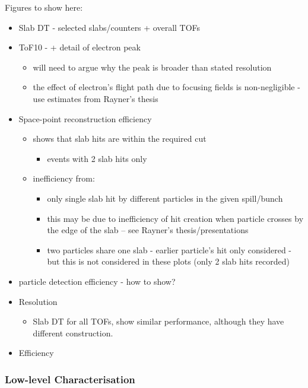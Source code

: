 Figures to show here:
\begin{itemize}
\item Slab DT - selected slabs/counters + overall TOFs
\item ToF10 - + detail of electron peak
  \begin{itemize} \it
  \item will need to argue why the peak is broader than stated
    resolution
  \item the effect of electron's flight path due to focusing fields is
    non-negligible - use estimates from Rayner's thesis
  \end{itemize}
\item Space-point reconstruction efficiency
  \begin{itemize}
  \item shows that slab hits are within the required cut
    \begin{itemize}
    \item events with 2 slab hits only
    \end{itemize}
  \item inefficiency from:
    \begin{itemize}
    \item only single slab hit by different particles in the given
      spill/bunch
    \item this may be due to inefficiency of hit creation when
      particle crosses by the edge of the slab -- see Rayner's
      thesis/presentations
    \item two particles share one slab - earlier particle's hit only
      considered - but this is not considered in these plots (only 2
      slab hits recorded)
    \end{itemize}
  \end{itemize}
\item particle detection efficiency - how to show?
\item Resolution
  \begin{itemize}
  \item Slab DT for all TOFs, show similar performance, although
    they have different construction.
  \end{itemize}
\item {}Efficiency
\end{itemize}


\subsubsection{Low-level Characterisation}

